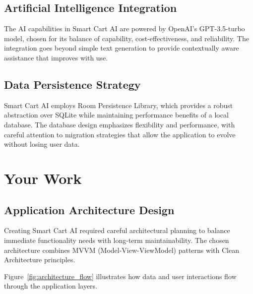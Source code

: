 \documentclass[11pt,a4paper]{article}
\begin{document}
\subsection{Artificial Intelligence Integration}

The AI capabilities in Smart Cart AI are powered by OpenAI's GPT-3.5-turbo model, chosen for its balance of capability, cost-effectiveness, and reliability. The integration goes beyond simple text generation to provide contextually aware assistance that improves with use.

\subsection{Data Persistence Strategy}

Smart Cart AI employs Room Persistence Library, which provides a robust abstraction over SQLite while maintaining performance benefits of a local database. The database design emphasizes flexibility and performance, with careful attention to migration strategies that allow the application to evolve without losing user data.

\section{Your Work}

\subsection{Application Architecture Design}

Creating Smart Cart AI required careful architectural planning to balance immediate functionality needs with long-term maintainability. The chosen architecture combines MVVM (Model-View-ViewModel) patterns with Clean Architecture principles.

Figure~\ref{fig:architecture_flow} illustrates how data and user interactions flow through the application layers.
\end{document}
